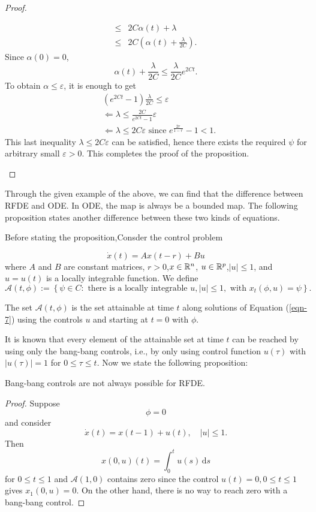 \begin{proof}
\begin{enumerate}
\begin{equation*}
\begin{aligned}
      \le & 2 C \alpha(t)+\lambda\\
      \le & 2C\left( \alpha(t)+\frac{\lambda}{2C} \right) .
    \end{aligned}
  \end{equation*}
  Since $\alpha(0)=0$,
  \[
    \alpha(t)+\frac{\lambda}{2C}\le \frac{\lambda}{2C}e^{2Ct}.
  \] 
  To obtain $\alpha\le \varepsilon $, it is enough to get 
  \begin{equation*}
    \begin{aligned}
      & \left( e^{2Ct}-1 \right) \frac{\lambda}{2C}\le \varepsilon \\
      & \Leftarrow \lambda\le \frac{2C}{e^{2Ct}-1}\varepsilon \\
      & \Leftarrow \lambda\le 2C\varepsilon  \text{ since }e^{\frac{2r}{1-r}}-1<1.
    \end{aligned}
  \end{equation*}
  This last inequality $\lambda\le 2C\varepsilon $ can be satisfied, hence there exists the required $\psi $ for arbitrary small $\varepsilon >0$. This completes the proof of the proposition.
\end{enumerate}
\end{proof}
Through the given example of the above, we can find that the difference between RFDE and ODE. In ODE, the map is always be a bounded map. The following proposition states another difference between these two kinds of equations.


Before stating the proposition,Consder the control problem 

\begin{equation}\label{eqn-7}
  \dot{x}(t)=Ax(t-r)+Bu
\end{equation}
where $A$ and $B$ are constant matrices, $r>0$,$x\in \mathbb{R}^{n}$, $u\in \mathbb{R}^{p}$,$ |u|\le 1$, and $u=u(t)$ is a locally integrable function.
We define
\[
  \mathcal{A}(t,\phi):=\left\{\psi \in C: \text{ there is a locally integrable }u, |u|\le 1, \text{ with }x_t(\phi,u)=\psi\right\} . 
\]

The set $\mathcal{A}(t,\phi)$ is the set attainable at time $t$ along solutions of Equation (\ref{eqn-7}) using the controls $u$ and starting at $t=0$ with $\phi$.

It is known that every element of the attainable set at time $t$ can be reached by using only the bang-bang controls, i.e., by only using control function $u(\tau )$ with $|u(\tau )|=1$ for $0\le \tau \le t$. Now we state the following proposition:
\begin{proposition}
  Bang-bang controls are not always possible for RFDE.
\end{proposition}
\begin{proof}
  Suppose 
  \[
  \phi=0
  \] 
  and consider 
  \begin{equation}
    \dot{x}(t)=x(t-1)+u(t),\quad |u|\le 1.
  \end{equation}
  Then 
  \[
    x(0,u)(t)= \int_0^{t}u(s)\,\mathrm{d}s
  \] 
  for $0\le t\le 1$ and $\mathcal{A}(1,0)$ contains zero since the control $u(t)=0,0\le t\le 1$ gives $x_1(0,u)=0$. On the other hand, there is no way to reach zero with a bang-bang control.
\end{proof}
